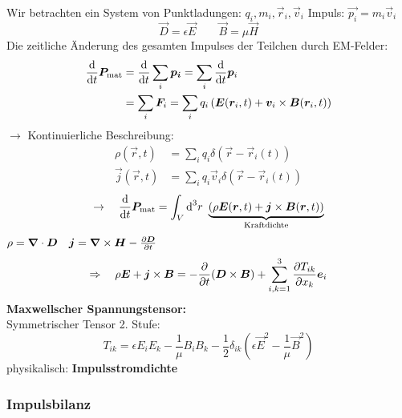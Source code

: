 Wir betrachten ein System von Punktladungen: $ q_i, m_i, \vec{r}_i, \vec{v}_i $
Impuls: $ \vec{p_i} = m_i \vec{v}_i $
\begin{equation*}
\vec{D} = \epsilon \vec{E} \qquad \vec{B} = \mu \vec{H}
\end{equation*}
Die zeitliche Änderung des gesamten Impulses der Teilchen durch EM-Felder:
\begin{align*}
\frac{\textrm{d} }{\textrm{d} t} \bm{P}_{\textrm{mat}} &= \frac{\textrm{d} }{\textrm{d} t} \sum_i \bm{p_i} = \sum_i \frac{\textrm{d} }{\textrm{d} t} \bm{p}_i\\
&= \sum_i \bm{F}_i = \sum_i q_i \left(\bm{E}(\bm{r}_i, t) + \bm{v}_i \times \bm{B}(\bm{r}_i, t)\right)
\end{align*}
$ \rightarrow $ Kontinuierliche Beschreibung:
\begin{align*}
\rho(\vec{r},t) &= \sum_i q_i \delta(\vec{r} - \vec{r}_i(t))\\
\vec{j}(\vec{r},t) &= \sum_i q_i \vec{v}_i \delta(\vec{r} - \vec{r}_i(t))
\end{align*}
\begin{equation*}
\rightarrow \quad \frac{\textrm{d} }{\textrm{d} t} \bm{P}_{\textrm{mat}} = \int_V \textrm{d}^3 r \ \underbrace{\left(\rho \bm{E}(\bm{r},t) + \bm{j} \times \bm{B}(\bm{r},t)\right)}_{\textrm{Kraftdichte}}
\end{equation*}
$ \rho = \bm{\nabla} \cdot \bm{D} \quad \bm{j} = \bm{\nabla} \times \bm{H} - \frac{\partial \bm{D}}{\partial t} $
\begin{equation*}
\Rightarrow \quad \rho \bm{E} + \bm{j} \times \bm{B} = - \frac{\partial }{\partial t} (\bm{D} \times \bm{B}) + \sum_{i,k=1}^{3} \frac{\partial T_{ik}}{\partial x_k} \bm{e}_i
\end{equation*}
\textbf{Maxwellscher Spannungstensor:}\\[5pt]
Symmetrischer Tensor 2. Stufe:
\begin{equation*}
T_{ik} = \epsilon E_i E_k - \frac{1}{\mu} B_i B_k - \frac{1}{2} \delta_{ik}(\epsilon \vec{E}^2 - \frac{1}{\mu} \vec{B}^2)
\end{equation*}
physikalisch: \textbf{Impulsstromdichte}

\subsubsection{Impulsbilanz}

